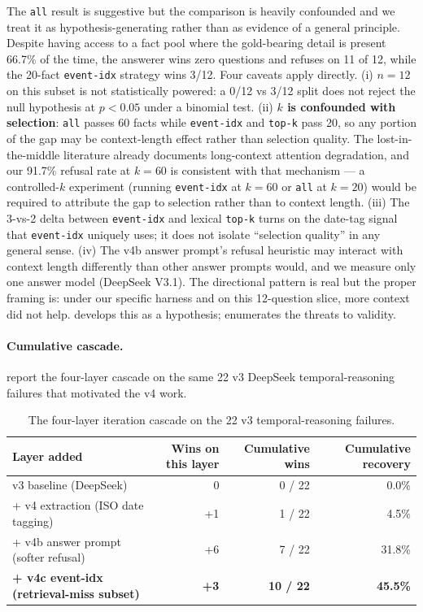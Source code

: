 \documentclass{article}
\begin{document}
The \texttt{all} result is suggestive but the comparison is heavily confounded and we treat it as hypothesis-generating rather than as evidence of a general principle. Despite having access to a fact pool where the gold-bearing detail is present 66.7\% of the time, the answerer wins zero questions and refuses on 11 of 12, while the 20-fact \texttt{event-idx} strategy wins 3/12. Four caveats apply directly. (i) \textbf{$n=12$} on this subset is not statistically powered: a 0/12 vs 3/12 split does not reject the null hypothesis at $p<0.05$ under a binomial test. (ii) \textbf{$k$ is confounded with selection}: \texttt{all} passes 60 facts while \texttt{event-idx} and \texttt{top-k} pass 20, so any portion of the gap may be context-length effect rather than selection quality. The lost-in-the-middle literature \citep{liu2024lost} already documents long-context attention degradation, and our 91.7\% refusal rate at $k=60$ is consistent with that mechanism --- a controlled-$k$ experiment (running \texttt{event-idx} at $k=60$ or \texttt{all} at $k=20$) would be required to attribute the gap to selection rather than to context length. (iii) The 3-vs-2 delta between \texttt{event-idx} and lexical \texttt{top-k} turns on the date-tag signal that \texttt{event-idx} uniquely uses; it does not isolate ``selection quality'' in any general sense. (iv) The v4b answer prompt's refusal heuristic may interact with context length differently than other answer prompts would, and we measure only one answer model (DeepSeek V3.1). The directional pattern is real but the proper framing is: under our specific harness and on this 12-question slice, more context did not help.  develops this as a hypothesis;  enumerates the threats to validity.

\paragraph{Cumulative cascade.}  report the four-layer cascade on the same 22 v3 DeepSeek temporal-reasoning failures that motivated the v4 work.

\begin{table}[h]
\centering
\small
\caption{The four-layer iteration cascade on the 22 v3 temporal-reasoning failures.}
\label{tab:cascade}
\begin{tabular}{lrrr}
\toprule
Layer added                                & Wins on this layer & Cumulative wins & Cumulative recovery \\
\midrule
v3 baseline (DeepSeek)                     & 0  & 0 / 22  & 0.0\%  \\
+ v4 extraction (ISO date tagging)         & +1 & 1 / 22  & 4.5\%  \\
+ v4b answer prompt (softer refusal)       & +6 & 7 / 22  & 31.8\% \\
\textbf{+ v4c event-idx (retrieval-miss subset)} & \textbf{+3} & \textbf{10 / 22} & \textbf{45.5\%} \\
\bottomrule
\end{tabular}
\end{table}
\end{document}
